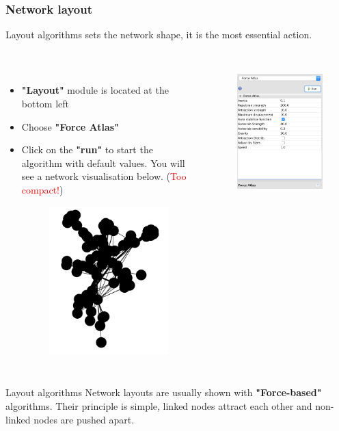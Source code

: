 \documentclass[10pt]{beamer}
\begin{document}
\begin{frame}
\frametitle{Network layout}
Layout algorithms sets the network shape, it is the most essential action. \\~\\

\begin{columns}[c] 
\begin{itemize}
\item \textbf{"Layout"} module is located at the bottom left
\item Choose \textbf{"Force Atlas"}
\item Click on the \textbf{"run"} to start the algorithm with default values. You will see a network visualisation below. (\textcolor{red}{Too compact!})
\begin{figure}
\includegraphics[width=0.3\linewidth]{figures/network_with_layout_default.png}
\end{figure}
\end{itemize}

\begin{figure}
\includegraphics[width=0.5\linewidth]{figures/layout_default.png}
\end{figure}
\end{columns}

\begin{block}{Layout algorithms}
Network layouts are usually shown with \textbf{"Force-based"} algorithms. Their principle is simple, linked nodes attract each other and non-linked nodes are pushed apart.
\end{block}
\end{frame}
\end{document}
